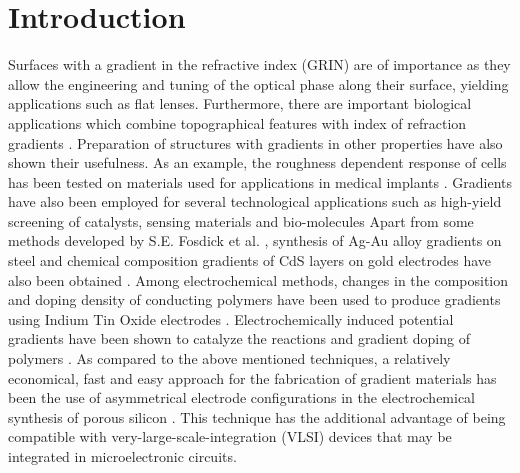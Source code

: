 \documentclass[review,sort&compress]{cas-sc}
\begin{document}
\section{Introduction}
\label{sec:introduction}
Surfaces with a gradient in the refractive index (GRIN) are of
importance as they allow the engineering and tuning of the optical
phase along their surface, yielding applications such as flat
lenses. Furthermore, there are important biological applications
which combine topographical features with index of refraction
gradients \cite{pierscionek2012gradient}. Preparation of structures
with gradients in other properties have also shown their
usefulness. As an example, the
roughness dependent  response of cells has been tested on
materials used for applications in medical implants
\cite{bai2020bioinspired}.
Gradients have also been employed for several
technological applications such as high-yield screening of catalysts,
sensing materials and bio-molecules \cite{maier2007combinatorial, jayaraman2004construction,
potyrailo2008combinatorial}
Apart from some methods developed by S.E. Fosdick et al. \cite{fosdick2010two},
synthesis of  Ag-Au alloy gradients on steel and chemical composition
gradients of CdS layers
on gold electrodes have also been obtained
\cite{ramaswamy_screening_2011,ramakrishnan_display_2010}.
Among electrochemical methods, changes in the composition and doping density
of  conducting polymers have been used to produce gradients using Indium Tin
Oxide electrodes \cite{inagi2010bipolar}.
Electrochemically induced potential gradients have been shown to catalyze the
reactions and gradient doping of polymers \cite{qin2020bipolar, ishiguro2011gradient}.
As compared to the above mentioned techniques, a relatively economical,
fast and easy approach for the fabrication
of gradient materials has been the use  of asymmetrical
electrode configurations in the electrochemical synthesis of porous silicon \cite{sailor2012porous}.
This technique has the additional advantage of being compatible
with very-large-scale-integration (VLSI) devices that may be
integrated in  microelectronic circuits.
\end{document}
